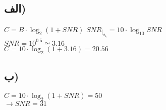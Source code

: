 \def \Subject {}


\section{\Subject}

\subsection{الف)}


\null \hfill $ C = B \cdot \log_{2} \left (1 + SNR \right) $
 \null \hfill $ SNR_[_d_b_] = 10 \cdot \log_{10} SNR $ \\
 \null \hfill $ SNR = 10^0.5 \simeq 3.16 $ \\
 \null \hfill $ C = 10 \cdot \log_{2} \left (1 + 3.16 \right) = 20.56 $
 


\subsection{ب)}
\null \hfill $ C = 10 \cdot \log_{2} \left (1 + SNR \right) = 50 $ \\
\null \hfill $ \rightarrow SNR = 31 $
